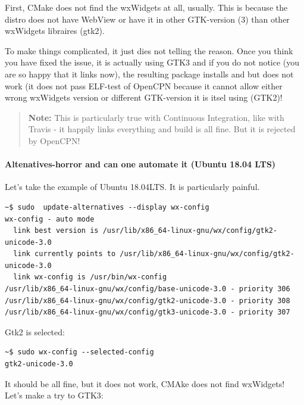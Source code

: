 \documentclass[11pt]{article}
\begin{document}
    First, CMake does not find the wxWidgets at all, usually. This is
because the distro does not have WebView or have it in other GTK-version
(3) than other wxWidgets libraires (gtk2).

    To make things complicated, it just dies not telling the reason. Once
you think you have fixed the issue, it is actually using GTK3 and if you
do not notice (you are so happy that it links now), the resulting
package installs and but does not work (it does not pass ELF-test of
OpenCPN because it cannot allow either wrong wxWidgets version or
different GTK-version it is itsel using (GTK2)!

    \begin{quote}
\textbf{Note:} This is particularly true with Continuous Integration,
like with Travis - it happily links everything and build is all fine.
But it is rejected by OpenCPN!
\end{quote}

    \hypertarget{altenatives-horror-and-can-one-automate-it-ubuntu-18.04-lts}{%
\paragraph{Altenatives-horror and can one automate it (Ubuntu 18.04
LTS)}\label{altenatives-horror-and-can-one-automate-it-ubuntu-18.04-lts}}

    Let's take the example of Ubuntu 18.04LTS. It is particularly painful.

    \begin{verbatim}
~$ sudo  update-alternatives --display wx-config
wx-config - auto mode
  link best version is /usr/lib/x86_64-linux-gnu/wx/config/gtk2-unicode-3.0
  link currently points to /usr/lib/x86_64-linux-gnu/wx/config/gtk2-unicode-3.0
  link wx-config is /usr/bin/wx-config
/usr/lib/x86_64-linux-gnu/wx/config/base-unicode-3.0 - priority 306
/usr/lib/x86_64-linux-gnu/wx/config/gtk2-unicode-3.0 - priority 308
/usr/lib/x86_64-linux-gnu/wx/config/gtk3-unicode-3.0 - priority 307
\end{verbatim}

    Gtk2 is selected:

    \begin{verbatim}
~$ sudo wx-config --selected-config
gtk2-unicode-3.0
\end{verbatim}

    It should be all fine, but it does not work, CMAke does not find
wxWidgets! Let's make a try to GTK3:
\end{document}
